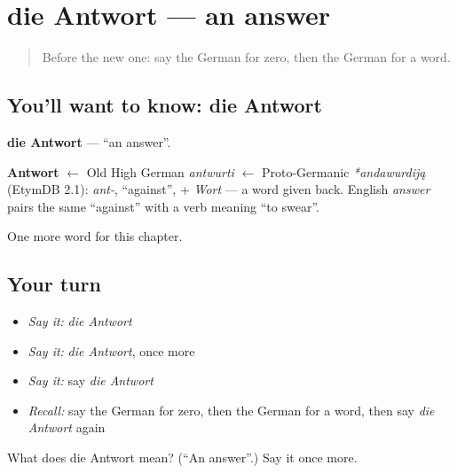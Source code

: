 \section[die Antwort]{die Antwort — an answer}

\label{lesson:GE-C102-antwort}



\begin{quote}
Before the new one: say the German for zero, then the German for a word.
\end{quote}

\subsection*{You'll want to know: die Antwort}
\textbf{die Antwort} — \textquotedblleft{}an answer\textquotedblright{}.

\begin{cousinweb}
\textbf{Antwort} $\leftarrow$ Old High German \emph{antwurti} $\leftarrow$ Proto-Germanic \emph{*andawurdiją} (EtymDB 2.1): \emph{ant-}, \textquotedblleft{}against\textquotedblright{}, + \emph{Wort} — a word given back. English \emph{answer} pairs the same \textquotedblleft{}against\textquotedblright{} with a verb meaning \textquotedblleft{}to swear\textquotedblright{}.
\end{cousinweb}

\begin{grammarlens}[title={What you've built}]
One more word for this chapter.
\end{grammarlens}

\subsection*{Your turn}
\begin{itemize}
\raggedright
  \item \emph{Say it:} \emph{die Antwort}
  \item \emph{Say it:} \emph{die Antwort}, once more
  \item \emph{Say it:} say \emph{die Antwort}
  \item \emph{Recall:} say the German for zero, then the German for a word, then say \emph{die Antwort} again
\end{itemize}

\begin{tcolorbox}[breakable,colback=teal!4,colframe=teal!35!black,title={Before you move on}]
What does die Antwort mean? (\textquotedblleft{}An answer\textquotedblright{}.) Say it once more.
\end{tcolorbox}
